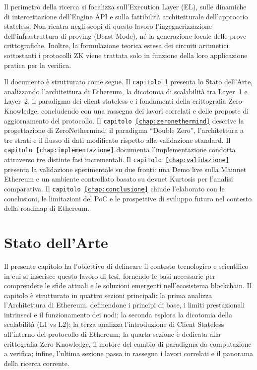 \documentclass[12pt,a4paper,openright,twoside]{report}
\begin{document}
Il perimetro della ricerca si focalizza sull'Execution Layer (EL), sulle dinamiche di intercettazione dell'Engine API e sulla fattibilità architetturale dell'approccio stateless. Non rientra negli scopi di questo lavoro l'ingegnerizzazione dell'infrastruttura di proving (Beast Mode), né la generazione locale delle prove crittografiche. Inoltre, la formulazione teorica estesa dei circuiti aritmetici sottostanti i protocolli ZK viene trattata solo in funzione della loro applicazione pratica per la verifica.

Il documento è strutturato come segue. Il \texttt{capitolo~\ref{chap:stato_arte}} presenta lo Stato dell'Arte, analizzando l'architettura di Ethereum, la dicotomia di scalabilità tra Layer~1 e Layer~2, il paradigma dei client stateless e i fondamenti della crittografia Zero-Knowledge, concludendo con una rassegna dei lavori correlati e delle proposte di aggiornamento del protocollo. Il \texttt{capitolo~\ref{chap:zeronethermind}} descrive la progettazione di ZeroNethermind: il paradigma ``Double Zero'', l'architettura a tre strati e il flusso di dati modificato rispetto alla validazione standard. Il \texttt{capitolo~\ref{chap:implementazione}} documenta l'implementazione condotta attraverso tre distinte fasi incrementali. Il \texttt{capitolo~\ref{chap:validazione}} presenta la validazione sperimentale su due fronti: una Demo live sulla Mainnet Ethereum e un ambiente controllato basato su devnet Kurtosis per l'analisi comparativa. Il \texttt{capitolo~\ref{chap:conclusione}} chiude l'elaborato con le conclusioni, le limitazioni del PoC e le prospettive di sviluppo futuro nel contesto della roadmap di Ethereum.

\chapter{Stato dell'Arte}\label{chap:stato_arte}

Il presente capitolo ha l'obiettivo di delineare il contesto tecnologico e scientifico in cui si inserisce questo lavoro di tesi, fornendo le basi necessarie per comprendere le sfide attuali e le soluzioni emergenti nell'ecosistema blockchain. Il capitolo è strutturato in quattro sezioni principali: la prima analizza l'Architettura di Ethereum, definendone i principi di base, i limiti prestazionali intrinseci e il funzionamento dei nodi; la seconda esplora la dicotomia della scalabilità (L1 vs L2); la terza analizza l'introduzione di Client Stateless all'interno del protocollo di Ethereum; la quarta sezione è dedicata alla crittografia Zero-Knowledge, il motore del cambio di paradigma da computazione a verifica; infine, l'ultima sezione passa in rassegna i lavori correlati e il panorama della ricerca corrente.
\end{document}
